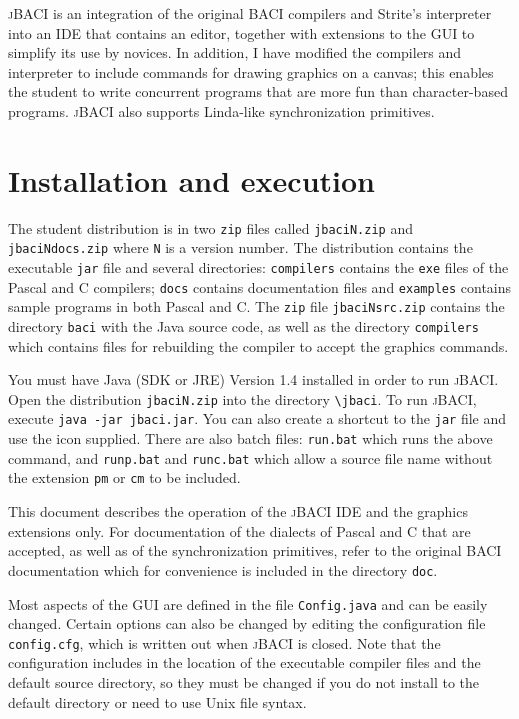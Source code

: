 \documentclass[11pt]{article}
\newcommand{\jb}{\textsc{\sffamily jBACI}}
\newcommand{\baci}{\textsc{\sffamily BACI}}
\newcommand{\p}[1]{\texttt{#1}}
\begin{document}
\jb{} is an integration of the original \baci{} compilers and
Strite's interpreter into an IDE that contains an editor,
together with extensions to the GUI to simplify its use by novices.
In addition, I have modified the compilers and interpreter
to include commands for drawing graphics on a canvas;
this enables the student to write concurrent programs that
are more fun than character-based programs.
\jb{} also supports Linda-like synchronization primitives.

\newpage

\section{Installation and execution}

The student distribution is in two \p{zip} files
called \p{jbaciN.zip} and \p{jbaciNdocs.zip} where \p{N} is a version number.
The distribution contains
the executable \p{jar} file and several directories:
\p{compilers} contains the \p{exe} files of the Pascal
and C compilers; \p{docs} contains documentation files
and \p{examples} contains sample programs in both Pascal and C.
The \p{zip} file \p{jbaciNsrc.zip} contains
the directory \p{baci} with the Java source code,
as well as the directory \p{compilers} which contains files for rebuilding
the compiler to accept the graphics commands.

You must have Java (SDK or JRE) Version 1.4 installed
in order to run \jb{}.
Open the distribution \p{jbaciN.zip} into the directory
\verb=\=\p{jbaci}.
To run \jb{}, execute \p{java -jar jbaci.jar}.
You can also create a shortcut to the \p{jar} file and use the icon supplied.
There are also batch files:
\p{run.bat} which runs the above command,
and \p{runp.bat} and \p{runc.bat} which allow a
source file name without the extension \p{pm} or \p{cm} to be included.

This document describes the operation of the \jb{} IDE
and the graphics extensions only.
For documentation of the dialects of Pascal and C that are accepted,
as well as of the synchronization primitives,
refer to the original \baci{} documentation which for convenience
is included in the directory \p{doc}.

Most aspects of the GUI are defined in the file \p{Config.java}
and can be easily changed.
Certain options can also be changed by editing the configuration file
\p{config.cfg}, which is written out when \jb{} is closed.
Note that the configuration includes in the location of the
executable compiler files and the default source directory,
so they must be changed if you do not
install to the default directory or need to use Unix file syntax.
\end{document}
